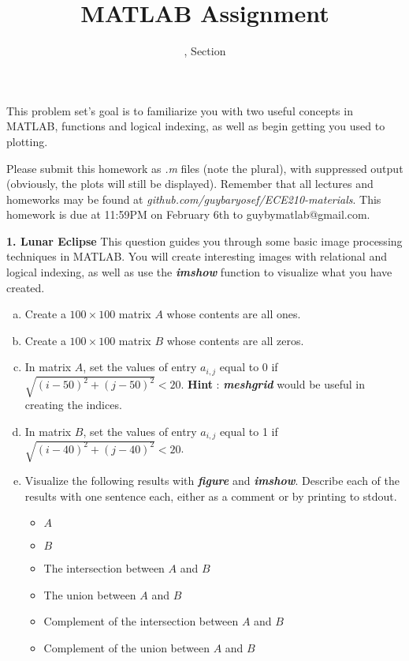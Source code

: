 \documentclass[11pt]{article}
\title{MATLAB Assignment \Homework}
\author{\Session, Section \Section}
\date{}
\makeatletter
\def\MyEmail{guybymatlab@gmail.com}
\def\DateOfSubmission{February 6th }
\makeatother
\begin{document}
\maketitle
This problem set's goal is to familiarize you with two useful concepts in MATLAB,
functions and logical indexing, as well as begin getting you used to plotting.

Please submit this homework as \textit{.m} files (note the plural), 
with suppressed output (obviously, the plots will still be displayed).
Remember that all lectures and homeworks may be found at 
\textit{github.com/guybaryosef/ECE210-materials}.
This homework is due at 11:59PM on \DateOfSubmission to \MyEmail. 


\noindent
\newline
\textbf{1. Lunar Eclipse} 
This question guides you through some basic image processing techniques in MATLAB. 
You will create interesting images with relational and logical indexing, 
as well as use the \textbf{\textit{imshow}} function to visualize what you have created.  
\begin{enumerate}[a.]

    \item Create a $100 \times 100$ matrix $A$ whose contents are all ones.
    
    \item Create a $100 \times 100$ matrix $B$ whose contents are all zeros.
    
    \item In matrix $A$, set the values of entry $a_{i,j}$ equal to 0 
    if $\sqrt{(i-50)^2 + (j-50)^2} < 20$. 
    \textbf{Hint} : \textbf{\textit{meshgrid}} would be useful in creating the indices.
    
    \item In matrix $B$, 
    set the values of entry $a_{i,j}$ equal to 1 if $\sqrt{(i-40)^2 + (j-40)^2} < 20$.
    
    \item Visualize the following results with \textbf{\textit{figure}} and \textbf{\textit{imshow}}. 
    Describe each of the results with one sentence each,
    either as a comment or by printing to stdout. 
    \begin{itemize}
        \item $A$
        \item $B$
        \item The intersection between $A$ and $B$
        \item The union between $A$ and $B$
        \item Complement of the intersection between $A$ and $B$
        \item Complement of the union between $A$ and $B$
    \end{itemize}

\end{enumerate}
\end{document}
